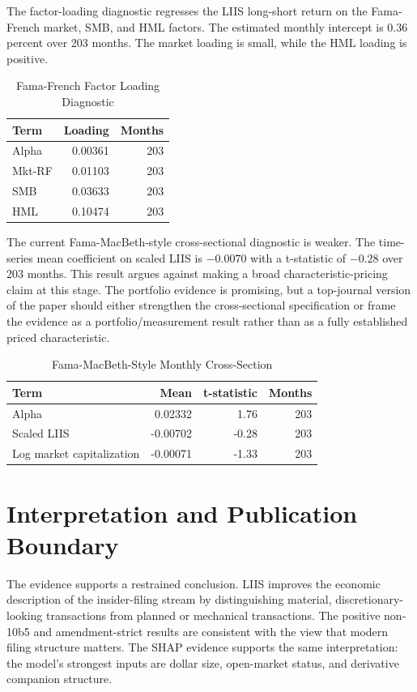 \documentclass[11pt]{article}
\begin{document}
The factor-loading diagnostic regresses the LIIS long-short return on the
Fama-French market, SMB, and HML factors. The estimated monthly intercept is
0.36 percent over 203 months. The market loading is small, while the HML loading
is positive.

\begin{table}[H]
\centering
\caption{Fama-French Factor Loading Diagnostic}
\label{tab:factors}
\begin{tabular}{lrr}
\toprule
Term & Loading & Months\\
\midrule
Alpha & 0.00361 & 203\\
Mkt-RF & 0.01103 & 203\\
SMB & 0.03633 & 203\\
HML & 0.10474 & 203\\
\bottomrule
\end{tabular}
\end{table}

The current Fama-MacBeth-style cross-sectional diagnostic is weaker. The
time-series mean coefficient on scaled LIIS is $-0.0070$ with a t-statistic of
$-0.28$ over 203 months. This result argues against making a broad
characteristic-pricing claim at this stage. The portfolio evidence is promising,
but a top-journal version of the paper should either strengthen the
cross-sectional specification or frame the evidence as a portfolio/measurement
result rather than as a fully established priced characteristic.

\begin{table}[H]
\centering
\caption{Fama-MacBeth-Style Monthly Cross-Section}
\label{tab:fmb}
\begin{tabular}{lrrr}
\toprule
Term & Mean & t-statistic & Months\\
\midrule
Alpha & 0.02332 & 1.76 & 203\\
Scaled LIIS & -0.00702 & -0.28 & 203\\
Log market capitalization & -0.00071 & -1.33 & 203\\
\bottomrule
\end{tabular}
\end{table}

\section{Interpretation and Publication Boundary}

The evidence supports a restrained conclusion. LIIS improves the economic
description of the insider-filing stream by distinguishing material,
discretionary-looking transactions from planned or mechanical transactions. The
positive non-10b5 and amendment-strict results are consistent with the view that
modern filing structure matters. The SHAP evidence supports the same
interpretation: the model's strongest inputs are dollar size, open-market
status, and derivative companion structure.
\end{document}

